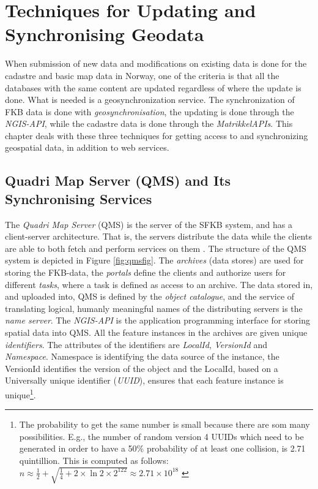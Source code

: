 \chapter{Techniques for Updating and Synchronising Geodata} \label{chap:tech}
When submission of new data and modifications on existing data is done for the cadastre and basic map data in Norway, one of the criteria is that all the databases with the same content are updated regardless of where the update is done. What is needed is a geosynchronization service. The synchronization of FKB data is done with \textit{geosynchronisation}, the updating is done through the \textit{NGIS-API}, while the cadastre data is done through the \textit{MatrikkelAPIs}.  This chapter deals with these three techniques for getting access to and synchronizing geospatial data, in addition to web services.  


\section{Quadri Map Server (QMS) and Its Synchronising Services}\label{ngis}
The \textit{Quadri Map Server} (QMS) is the server of the SFKB system,
and has a client-server architecture. That is, the servers distribute the data while the clients are able to both fetch and perform services on them \citep{NorkartAS2010}. 
The structure of the QMS system
is depicted in Figure \ref{fig:qmsfig}. The \textit{archives} (data stores) are used for storing the FKB-data, the \textit{portals} define the clients and authorize users for different \textit{tasks}, where a task is defined as access to an archive. The data stored in, and uploaded into, QMS is defined by the \textit{object catalogue}, and the service of translating logical, humanly meaningful names of the distributing servers is the \textit{name server}. The \textit{NGIS-API} is the application programming interface for storing spatial data into QMS. All the feature instances in the archives are given unique \textit{identifiers}. The attributes of the identifiers are \textit{LocalId}, \textit{VersionId} and \textit{Namespace}. Namespace is identifying the data source of the instance, the VersionId identifies the version of the object and the LocalId, based on a Universally unique identifier (\textit{UUID}), ensures that each feature instance is unique\footnote{The probability to get the same number is small because there are som many possibilities. E.g., the number of random version 4 UUIDs which need to be generated in order to have a 50\% probability of at least one collision, is 2.71 quintillion. This is computed as follows: $ n \approx \frac{1}{2} + \sqrt{\frac{1}{4}+2 \times \ln{2} \times  2^{122}} \approx 2.71 \times 10^{18} $ \citep{Eggan2017}}. 
 
